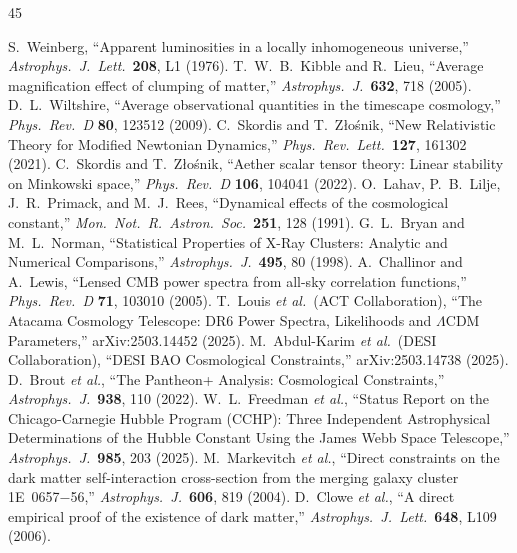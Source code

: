 \documentclass[11pt,a4paper]{article}
\begin{document}
\begin{thebibliography}{45}\raggedright\setlength{\itemsep}{1.5pt}\setlength{\parskip}{0pt}
 S.~Weinberg, ``Apparent luminosities in a locally inhomogeneous universe,'' \textit{Astrophys.\ J.\ Lett.}\ \textbf{208}, L1 (1976).
 T.~W.~B.~Kibble and R.~Lieu, ``Average magnification effect of clumping of matter,'' \textit{Astrophys.\ J.}\ \textbf{632}, 718 (2005).
 D.~L.~Wiltshire, ``Average observational quantities in the timescape cosmology,'' \textit{Phys.\ Rev.\ D} \textbf{80}, 123512 (2009).
 C.~Skordis and T.~Z{\l}o\'snik, ``New Relativistic Theory for Modified Newtonian Dynamics,'' \textit{Phys.\ Rev.\ Lett.}\ \textbf{127}, 161302 (2021).
 C.~Skordis and T.~Z{\l}o\'snik, ``Aether scalar tensor theory: Linear stability on Minkowski space,'' \textit{Phys.\ Rev.\ D} \textbf{106}, 104041 (2022).
 O.~Lahav, P.~B.~Lilje, J.~R.~Primack, and M.~J.~Rees, ``Dynamical effects of the cosmological constant,'' \textit{Mon.\ Not.\ R.\ Astron.\ Soc.}\ \textbf{251}, 128 (1991).
 G.~L.~Bryan and M.~L.~Norman, ``Statistical Properties of X-Ray Clusters: Analytic and Numerical Comparisons,'' \textit{Astrophys.\ J.}\ \textbf{495}, 80 (1998).
 A.~Challinor and A.~Lewis, ``Lensed CMB power spectra from all-sky correlation functions,'' \textit{Phys.\ Rev.\ D} \textbf{71}, 103010 (2005).
 T.~Louis \textit{et al.}\ (ACT Collaboration), ``The Atacama Cosmology Telescope: DR6 Power Spectra, Likelihoods and $\Lambda$CDM Parameters,'' arXiv:2503.14452 (2025).
 M.~Abdul-Karim \textit{et al.}\ (DESI Collaboration), ``DESI BAO Cosmological Constraints,'' arXiv:2503.14738 (2025).
 D.~Brout \textit{et al.}, ``The Pantheon+ Analysis: Cosmological Constraints,'' \textit{Astrophys.\ J.}\ \textbf{938}, 110 (2022).
 W.~L.~Freedman \textit{et al.}, ``Status Report on the Chicago-Carnegie Hubble Program (CCHP): Three Independent Astrophysical Determinations of the Hubble Constant Using the James Webb Space Telescope,'' \textit{Astrophys.\ J.}\ \textbf{985}, 203 (2025).
 M.~Markevitch \textit{et al.}, ``Direct constraints on the dark matter self-interaction cross-section from the merging galaxy cluster 1E~0657$-$56,'' \textit{Astrophys.\ J.}\ \textbf{606}, 819 (2004).
 D.~Clowe \textit{et al.}, ``A direct empirical proof of the existence of dark matter,'' \textit{Astrophys.\ J.\ Lett.}\ \textbf{648}, L109 (2006).

\end{thebibliography}
\end{document}

